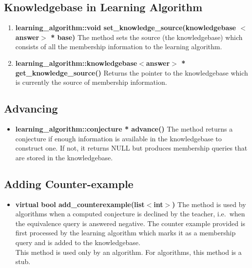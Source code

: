 \subsection*{Knowledgebase in Learning Algorithm}

\begin{enumerate}

 \item \textbf{learning\_algorithm::void set\_knowledge\_source(knowledgebase $<$answer$>$ * base)} \vskip 1pt
	The method sets the source (the knowledgebase) which consists of all the membership information to the learning algorithm.

 \item \textbf{learning\_algorithm::knowledgebase$<$answer$>$ * get\_knowledge\_source()} \vskip 1pt
	Returns the pointer to the knowledgebase which is currently the source of membership information.

\end{enumerate}

\subsection*{Advancing}

\begin{itemize}
 \item \textbf{learning\_algorithm::conjecture * advance()} \vskip 1pt
	The method returns a conjecture if enough information is available in the knowledgebase to construct one. If not, it returns NULL but produces membership queries that are stored in the knowledgebase.
\end{itemize}

\subsection*{Adding Counter-example}

\begin{itemize}
 \item \textbf{virtual bool add\_counterexample(list$<$int$>$)} \vskip 1pt
	The method is used by \online algorithms when a computed conjecture is declined by the teacher, i.e.\ when the equivalence query is answered negative. The counter example provided is first processed by the learning algorithm which marks it as a membership query and is added to the knowledgebase. \\
	This method is used only by an \online algorithm. For \offline algorithms, this method is a stub.
\end{itemize}

